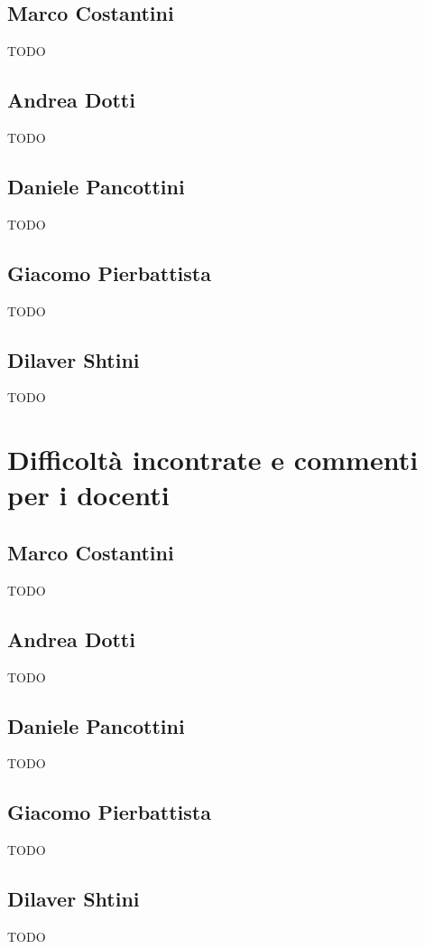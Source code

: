 \documentclass[a4paper,12pt]{report}
\begin{document}
\subsection*{Marco Costantini}
{TODO}

\subsection*{Andrea Dotti}
{TODO}

\subsection*{Daniele Pancottini}
{TODO}

\subsection*{Giacomo Pierbattista}
{TODO}

\subsection*{Dilaver Shtini}
{TODO}


\section{Difficoltà incontrate e commenti per i docenti}
\subsection*{Marco Costantini}
{TODO}

\subsection*{Andrea Dotti}
{TODO}

\subsection*{Daniele Pancottini}
{TODO}

\subsection*{Giacomo Pierbattista}
{TODO}

\subsection*{Dilaver Shtini}
{TODO}
\end{document}
